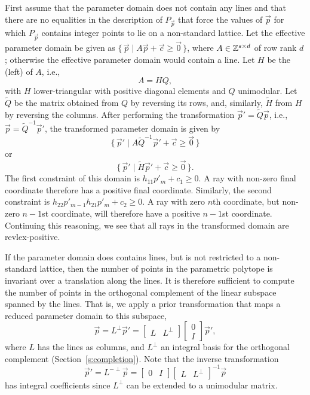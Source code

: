 First assume that the parameter domain does not contain any lines and
that there are no equalities in the description of $P_{\vec p}$ that force
the values of $\vec p$ for which $P_{\vec p}$ contains integer points
to lie on a non-standard lattice.
Let the effective parameter domain be given as
$
\{\, \vec p \mid A \vec p + \vec c \ge \vec 0 \,\}
$,
where $A \in \mathbb{Z}^{s \times d}$ of row rank $d$;
otherwise the effective parameter domain would contain a line.
Let $H$ be the (left)  of $A$, i.e.,
$$
A = H Q
,
$$
with $H$ lower-triangular with positive diagonal elements and
$Q$ unimodular.
Let $\tilde Q$ be the matrix obtained from $Q$ by reversing its rows,
and, similarly, $\tilde H$ from $H$ by reversing the columns.
After performing the transformation
$\vec p' = \tilde Q \vec p$, i.e.,
$\vec p = \tilde Q^{-1} \vec p'$, the transformed parameter domain
is given by
$$
\{\, \vec p' \mid A \tilde Q^{-1} \vec p' + \vec c \ge \vec 0 \,\}
$$
or
$$
\{\, \vec p' \mid \tilde H \vec p' + \vec c \ge \vec 0 \,\}
.
$$
The first constraint of this domain is
$h_{11} p'_m + c_1 \ge 0$.  A ray with non-zero final coordinate
therefore has a positive final coordinate.
Similarly, the second constraint is
$h_{22} p'_{m-1} h_{21} p'_m + c_2 \ge 0$.
A ray with zero $n$th coordinate, but non-zero $n-1$st coordinate,
will therefore have a positive $n-1$st coordinate.
Continuing this reasoning, we see that all rays in the transformed
domain are revlex-positive.

If the parameter domain does contains lines, but is not restricted
to a non-standard lattice, then the number of points in the parametric
polytope is invariant over a translation along the lines.
It is therefore sufficient to compute the number of points in the
orthogonal complement of the linear subspace spanned by the lines.
That is, we apply a prior transformation that maps a reduced parameter
domain to this subspace,
$$
\vec p = L^\perp \vec p' =
\begin{bmatrix}
L & L^\perp
\end{bmatrix}
\begin{bmatrix}
0 \\ I
\end{bmatrix}
\vec p'
,
$$
where $L$ has the lines as columns, and $L^\perp$ an integral basis
for the orthogonal complement (Section~\ref{s:completion}).
Note that the inverse transformation
$$
\vec p' =
L^{-\perp}
\vec p =
\begin{bmatrix}
0 & I
\end{bmatrix}
\begin{bmatrix}
L & L^\perp
\end{bmatrix}^{-1}
\vec p
$$
has integral coefficients since $L^\perp$ can be extended to a unimodular matrix.

